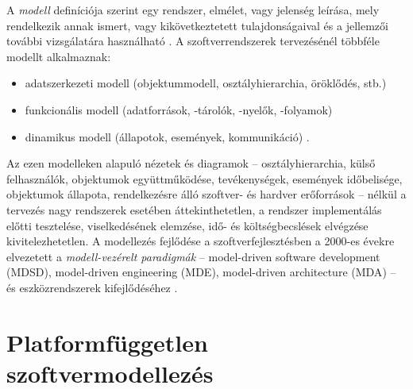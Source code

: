 A \emph{modell} definíciója szerint egy rendszer, elmélet, vagy jelenség leírása, mely rendelkezik annak ismert, vagy kikövetkeztetett tulajdonságaival és a jellemzői további vizsgálatára használható \cite{dict:Model}. 
A szoftverrendszerek tervezésénél többféle modellt alkalmaznak:
\begin{itemize}
	\item adatszerkezeti modell (objektummodell, osztályhierarchia, öröklődés, stb.)
	\item funkcionális modell (adatforrások, -tárolók, -nyelők, -folyamok)
	\item dinamikus modell (állapotok, események, kommunikáció) \cite{Kondorosi07}.
\end{itemize}
Az ezen modelleken alapuló nézetek és diagramok -- osztályhierarchia, külső felhasználók, objektumok együttműködése, tevékenységek, események időbelisége, objektumok állapota, rendelkezésre álló szoftver- és hardver erőforrások -- nélkül a tervezés nagy rendszerek esetében áttekinthetetlen, a rendszer implementálás előtti tesztelése, viselkedésének elemzése, idő- és költségbecslések elvégzése kivitelezhetetlen.
A modellezés fejlődése a szoftverfejlesztésben a 2000-es évekre elvezetett a \emph{modell-vezérelt paradigmák} -- model-driven software development (\gls{MDSD}), model-driven engineering (\gls{MDE}), model-driven architecture (\gls{MDA}) -- és eszközrendszerek kifejlődéséhez \cite{OMG:MDA:FAQ,Schmidt:MDE:10.1109/MC.2006.58,MDSD:TEM06}.


\section{Platformfüggetlen szoftvermodellezés}

